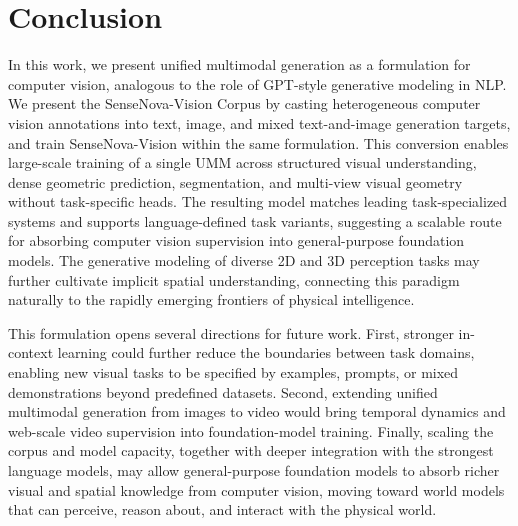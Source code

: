 \section{Conclusion}
\label{sec:conclusion}

In this work, we present unified multimodal generation as a formulation for computer vision, analogous to the role of GPT-style generative modeling in NLP.
We present the SenseNova-Vision Corpus by casting heterogeneous computer vision annotations into text, image, and mixed text-and-image generation targets, and train SenseNova-Vision within the same formulation.
This conversion enables large-scale training of a single UMM across structured visual understanding, dense geometric prediction, segmentation, and multi-view visual geometry without task-specific heads.
The resulting model matches leading task-specialized systems and supports language-defined task variants, suggesting a scalable route for absorbing computer vision supervision into general-purpose foundation models.
The generative modeling of diverse 2D and 3D perception tasks may further cultivate implicit spatial understanding, connecting this paradigm naturally to the rapidly emerging frontiers of physical intelligence.

This formulation opens several directions for future work.
First, stronger in-context learning could further reduce the boundaries between task domains, enabling new visual tasks to be specified by examples, prompts, or mixed demonstrations beyond predefined datasets.
Second, extending unified multimodal generation from images to video would bring temporal dynamics and web-scale video supervision into foundation-model training.
Finally, scaling the corpus and model capacity, together with deeper integration with the strongest language models, may allow general-purpose foundation models to absorb richer visual and spatial knowledge from computer vision, moving toward world models that can perceive, reason about, and interact with the physical world.
